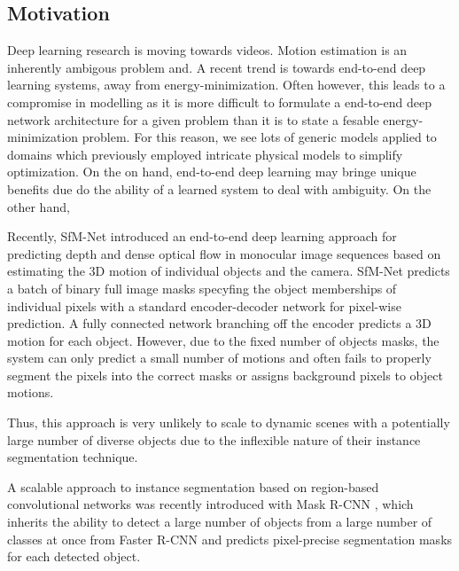 \subsection{Motivation}



Deep learning research is moving towards videos.
Motion estimation is an inherently ambigous problem and.
A recent trend is towards end-to-end deep learning systems, away from energy-minimization.
Often however, this leads to a compromise in modelling as it is more difficult to
formulate a end-to-end deep network architecture for a given problem than it is
to state a fesable energy-minimization problem.
For this reason, we see lots of generic models applied to domains which previously
employed intricate physical models to simplify optimization.
On the on hand, end-to-end deep learning may bringe unique benefits due do the ability
of a learned system to deal with ambiguity.
On the other hand,

Recently, SfM-Net \cite{SfmNet} introduced an end-to-end deep learning approach for predicting depth
and dense optical flow in monocular image sequences based on estimating the 3D motion of individual objects and the camera.
SfM-Net predicts a batch of binary full image masks specyfing the object memberships of individual pixels with a standard encoder-decoder
network for pixel-wise prediction. A fully connected network branching off the encoder predicts a 3D motion for each object.
However, due to the fixed number of objects masks, the system can only predict a small number of motions and
often fails to properly segment the pixels into the correct masks or assigns background pixels to object motions.

Thus, this approach is very unlikely to scale to dynamic scenes with a potentially
large number of diverse objects due to the inflexible nature of their instance segmentation technique.

A scalable approach to instance segmentation based on region-based convolutional networks
was recently introduced with Mask R-CNN \cite{MaskRCNN}, which inherits the ability to detect
a large number of objects from a large number of classes at once from Faster R-CNN
and predicts pixel-precise segmentation masks for each detected object.

